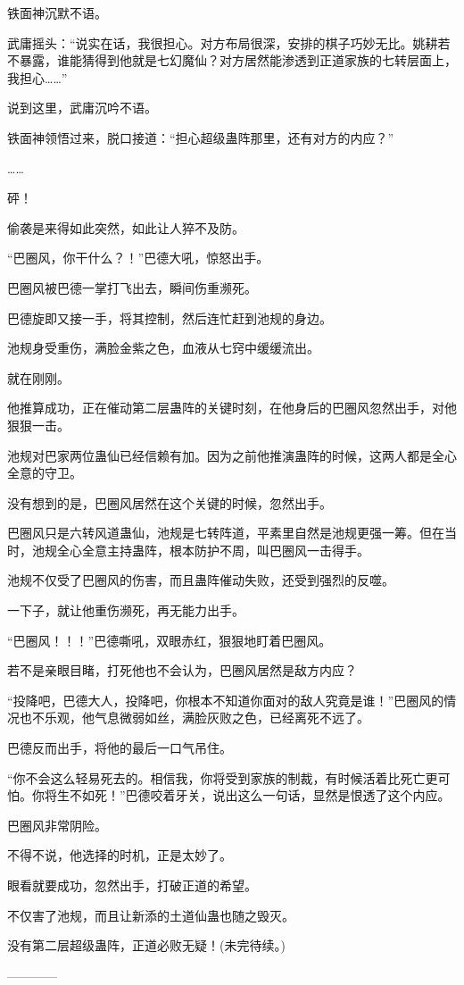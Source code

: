 \begin{this_body}
铁面神沉默不语。

武庸摇头：“说实在话，我很担心。对方布局很深，安排的棋子巧妙无比。姚耕若不暴露，谁能猜得到他就是七幻魔仙？对方居然能渗透到正道家族的七转层面上，我担心……”

说到这里，武庸沉吟不语。

铁面神领悟过来，脱口接道：“担心超级蛊阵那里，还有对方的内应？”

……

砰！

偷袭是来得如此突然，如此让人猝不及防。

“巴圈风，你干什么？！”巴德大吼，惊怒出手。

巴圈风被巴德一掌打飞出去，瞬间伤重濒死。

巴德旋即又接一手，将其控制，然后连忙赶到池规的身边。

池规身受重伤，满脸金紫之色，血液从七窍中缓缓流出。

就在刚刚。

他推算成功，正在催动第二层蛊阵的关键时刻，在他身后的巴圈风忽然出手，对他狠狠一击。

池规对巴家两位蛊仙已经信赖有加。因为之前他推演蛊阵的时候，这两人都是全心全意的守卫。

没有想到的是，巴圈风居然在这个关键的时候，忽然出手。

巴圈风只是六转风道蛊仙，池规是七转阵道，平素里自然是池规更强一筹。但在当时，池规全心全意主持蛊阵，根本防护不周，叫巴圈风一击得手。

池规不仅受了巴圈风的伤害，而且蛊阵催动失败，还受到强烈的反噬。

一下子，就让他重伤濒死，再无能力出手。

“巴圈风！！！”巴德嘶吼，双眼赤红，狠狠地盯着巴圈风。

若不是亲眼目睹，打死他也不会认为，巴圈风居然是敌方内应？

“投降吧，巴德大人，投降吧，你根本不知道你面对的敌人究竟是谁！”巴圈风的情况也不乐观，他气息微弱如丝，满脸灰败之色，已经离死不远了。

巴德反而出手，将他的最后一口气吊住。

“你不会这么轻易死去的。相信我，你将受到家族的制裁，有时候活着比死亡更可怕。你将生不如死！”巴德咬着牙关，说出这么一句话，显然是恨透了这个内应。

巴圈风非常阴险。

不得不说，他选择的时机，正是太妙了。

眼看就要成功，忽然出手，打破正道的希望。

不仅害了池规，而且让新添的土道仙蛊也随之毁灭。

没有第二层超级蛊阵，正道必败无疑！(未完待续。)

------------

\end{this_body}

